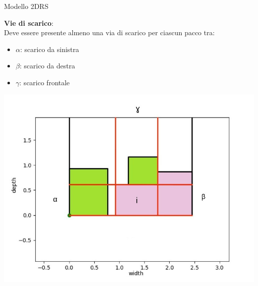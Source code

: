 \documentclass{beamer}
\begin{document}
\begin{frame}{Modello 2DRS}
											
	\begin{minipage}[c]{0.45\textwidth}
		\textbf{Vie di scarico}:\\Deve essere presente almeno una via di scarico per ciascun pacco tra:
		\begin{itemize}
			\item $\alpha$: scarico da sinistra
			\item $\beta$: scarico da destra
			\item $\gamma$: scarico frontale
		\end{itemize}
	\end{minipage}
	\hfill
	\begin{minipage}[c]{0.45\textwidth}
		\includegraphics[width=1\linewidth]{figures/abg_2drs}
	\end{minipage}
																												

\end{frame}
\end{document}
